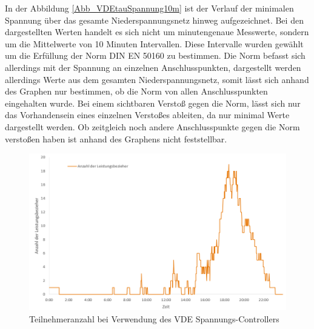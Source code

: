 In der Abbildung \ref{Abb_VDEtauSpannung10m} ist der Verlauf der minimalen Spannung über das gesamte Niederspannungsnetz hinweg aufgezeichnet. Bei den dargestellten Werten handelt es sich nicht um minutengenaue Messwerte, sondern um die Mittelwerte von 10 Minuten Intervallen. Diese Intervalle wurden gewählt um die Erfüllung der Norm DIN EN 50160 zu bestimmen. Die Norm befasst sich allerdings mit der Spannung an einzelnen Anschlusspunkten, dargestellt werden allerdings Werte aus dem gesamten Niederspannungsnetz, somit lässt sich anhand des Graphen nur bestimmen, ob die Norm von allen Anschlusspunkten eingehalten wurde. Bei einem sichtbaren Verstoß gegen die Norm, lässt sich nur das Vorhandensein eines einzelnen Verstoßes ableiten, da nur minimal Werte dargestellt werden. Ob zeitgleich noch andere Anschlusspunkte gegen die Norm verstoßen haben ist anhand des Graphens nicht feststellbar.
\begin{figure}[htb]
\centering
	\includegraphics[scale=0.7]{img/VDE_tau/Teilnehmer.png}
	\caption{Teilnehmeranzahl bei Verwendung des VDE Spannungs-Controllers}
	\label{Abb_VDEtauTeilnehmer}
\end{figure}

